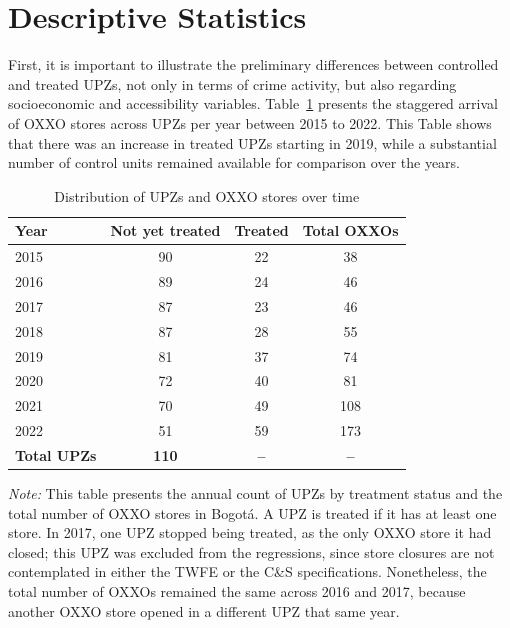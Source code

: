 \documentclass[12pt]{article}
\begin{document}
\section{Descriptive Statistics} 
\label{sec:Statistics}

First, it is important to illustrate the preliminary differences between controlled and treated UPZs, not only in terms of crime activity, but also regarding socioeconomic and accessibility variables. Table~\ref{tab:treatment_distribution_years} presents the staggered arrival of OXXO stores across UPZs per year between 2015 to 2022. This Table shows that there was an increase in treated UPZs starting in 2019, while a substantial number of control units remained available for comparison over the years.\\

\begin{table}
  \centering
  \caption{Distribution of UPZs and OXXO stores over time}
  \label{tab:treatment_distribution_years}
  \small 
  \begin{tabular}{l c c c}
    \toprule
    \textbf{Year} & \textbf{Not yet treated} & \textbf{Treated} & \textbf{Total OXXOs} \\
    \midrule
    \midrule
    2015 & 90 & 22 & 38 \\
    2016 & 89 & 24 & 46 \\
    2017 & 87 & 23 & 46 \\
    2018 & 87 & 28 & 55 \\
    2019 & 81 & 37 & 74 \\
    2020 & 72 & 40 & 81 \\
    2021 & 70 & 49 & 108 \\
    2022 & 51 & 59 & 173 \\
    \midrule
    \midrule
    \textbf{Total UPZs} & \textbf{110} & \textbf{--} & \textbf{--} \\
    \bottomrule
  \end{tabular}
  
  \vspace{0.5em}
  \begin{minipage}{0.65\textwidth} 
    \footnotesize \textit{Note:} This table presents the annual count of UPZs by treatment status and the total number of OXXO stores in Bogotá. A UPZ is treated if it has at least one store. In 2017, one UPZ stopped being treated, as the only OXXO store it had closed; this UPZ was excluded from the regressions, since store closures are not contemplated in either the TWFE or the C\&S specifications. Nonetheless, the total number of OXXOs remained the same across 2016 and 2017, because another OXXO store opened in a different UPZ that same year.
  \end{minipage}
\end{table}
\end{document}
